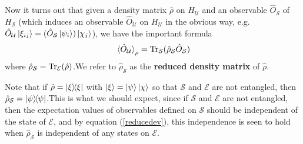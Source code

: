     Now it turns out that given a density matrix $\hat{\rho}$ on $H_\mathcal{U}$ and an observable $\hat{O}_\mathcal{S}$  of $H_\mathcal{S}$ (which induces an observable $\hat{O}_\mathcal{U}$ on $H_\mathcal{U}$ in the obvious way, e.g. $\hat{O}_\mathcal{U}\ket{\xi_{ij}}= (\hat{O}_\mathcal{S}\ket{\psi_i})\ket{\chi_j}$), we have the important formula 
    \begin{equation}\label{reducedev}
    \ev*{\hat{O}_\mathcal{U}}_\rho=\Tr_\mathcal{S}(\hat{\rho}_\mathcal{S}\hat{O}_\mathcal{S})
    \end{equation}
    where $ \hat{\rho}_\mathcal{S}=\operatorname{Tr}_\mathcal{E}(\hat{\rho})$.\footnotemark\;We  refer to $\hat{\rho}_\mathcal{S}$ as the \textbf{reduced density matrix} of $\hat{\rho}$. 
    
    Note that if $\hat{\rho}=\dyad{\xi}$ with $\ket{\xi}=\ket{\psi}\ket{\chi}$ so that $\mathcal{S}$ and $\mathcal{E}$ are not entangled, then $\hat{\rho}_\mathcal{S}=\dyad{\psi}$.\footnotemark\;This is what we should expect, since if $\mathcal{S}$ and $\mathcal{E}$ are not entangled, then the expectation values of observables defined on $\mathcal{S}$ should be independent of the state of $\mathcal{E}$, and by equation (\ref{reducedev}), this independence is seen to hold when $\hat{\rho}_\mathcal{S}$ is independent of any states on $\mathcal{E}$.
    
